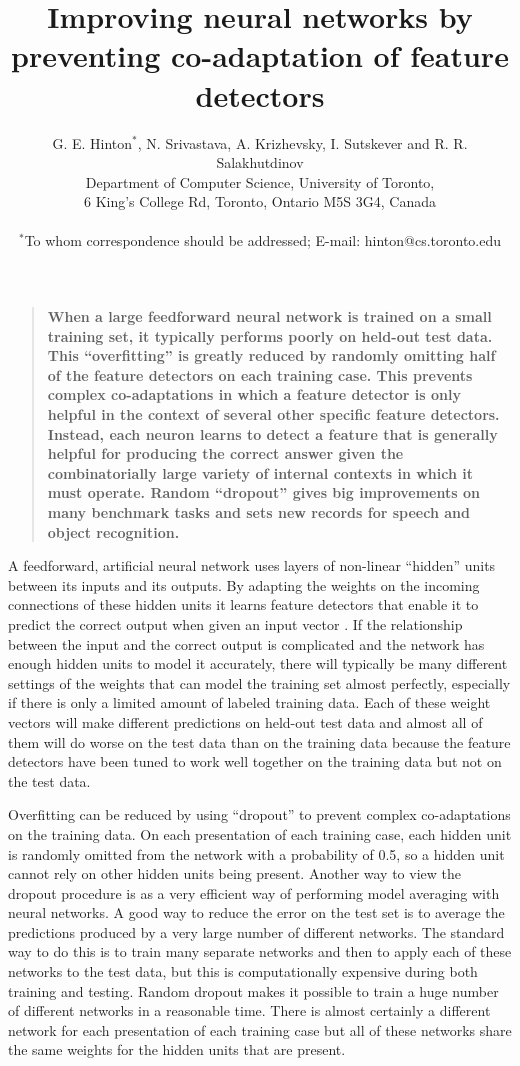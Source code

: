 \documentclass[12pt]{article}
\title{Improving neural networks by preventing co-adaptation of feature detectors}
\author{G. E. Hinton$^\ast$, N. Srivastava, A. Krizhevsky, I. Sutskever and R. R.  Salakhutdinov\\
\normalsize{Department of Computer Science, University of Toronto,}\\
\normalsize{6 King's College Rd, Toronto, Ontario M5S 3G4, Canada}\\
\\
\normalsize{$^\ast$To whom correspondence should be addressed; E-mail:  hinton@cs.toronto.edu}
}
\date{}
\newenvironment{sciabstract}{\begin{quote} \bf}
{\end{quote}}
\begin{document}
 





\maketitle 

\begin{sciabstract}
When a large feedforward neural network is trained on a small training set, it typically
performs poorly on held-out test data.  This ``overfitting'' is greatly reduced by
randomly omitting half of the feature detectors on each training case. This prevents
complex co-adaptations in which a feature detector is only helpful in the context of
several other specific feature detectors.  Instead, each neuron learns to detect a feature
that is generally helpful for producing the correct answer given the combinatorially large
variety of internal contexts in which it must operate. Random ``dropout'' gives big
improvements on many benchmark tasks and sets new records for speech and object
recognition.
\end{sciabstract}

A feedforward, artificial neural network uses layers of non-linear ``hidden''
units between its inputs and its outputs. By adapting the weights on the incoming
connections of these hidden units it learns feature detectors that enable it to predict
the correct output when given an input vector \cite{RHW}.  If the relationship between the
input and the correct output is complicated and the network has enough hidden units to
model it accurately, there will typically be many different settings of the weights that
can model the training set almost perfectly, especially if there is only a limited amount of
labeled training data.  Each of these weight vectors will make different predictions on
held-out test data and almost all of them will do worse on the test data than on the training
data because the feature detectors have been tuned to work well together on the training
data but not on the test data. 

Overfitting can be reduced by using ``dropout'' to prevent complex co-adaptations on the
training data. On each presentation of each training case, each hidden unit is randomly
omitted from the network with a probability of 0.5, so a hidden unit cannot rely on other
hidden units being present. Another way to view the dropout procedure is as a very
efficient way of performing model averaging with neural networks. A good way to reduce the
error on the test set is to average the predictions produced by a very large number of
different networks.  The standard way to do this is to train many separate networks and
then to apply each of these networks to the test data, but this is computationally
expensive during both training and testing.  Random dropout makes it possible to train a
huge number of different networks in a reasonable time. There is almost certainly a
different network for each presentation of each training case but all of these networks
share the same weights for the hidden units that are present.
\end{document}
